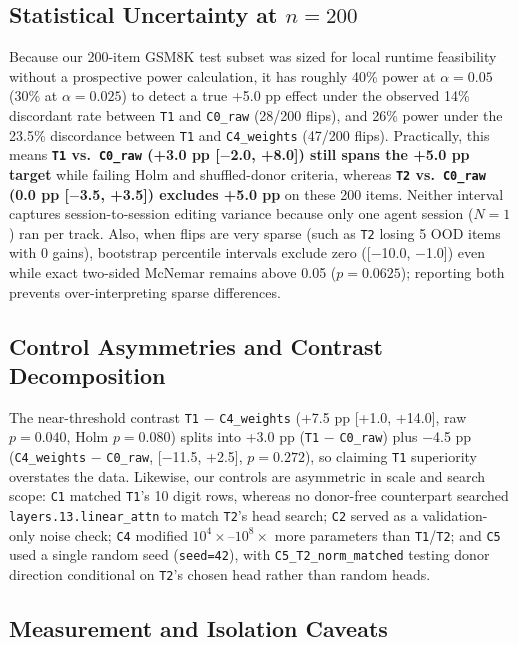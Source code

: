 \documentclass[11pt]{article}
\newcommand{\codepath}[1]{\texttt{\nolinkurl{#1}}}
\begin{document}
\subsection{Statistical Uncertainty at $n = 200$}

Because our 200-item GSM8K test subset was sized for local runtime feasibility without a prospective power calculation, it has roughly 40\% power at $\alpha=0.05$ (30\% at $\alpha=0.025$) to detect a true +5.0 pp effect under the observed 14\% discordant rate between \texttt{T1} and \texttt{C0\_raw} (28/200 flips), and 26\% power under the 23.5\% discordance between \texttt{T1} and \texttt{C4\_weights} (47/200 flips). Practically, this means \textbf{\texttt{T1} vs.\ \texttt{C0\_raw} (+3.0 pp [$-$2.0, +8.0]) still spans the +5.0 pp target} while failing Holm and shuffled-donor criteria, whereas \textbf{\texttt{T2} vs.\ \texttt{C0\_raw} (0.0 pp [$-$3.5, +3.5]) excludes +5.0 pp} on these 200 items. Neither interval captures session-to-session editing variance because only one agent session ($N=1$) ran per track. Also, when flips are very sparse (such as \texttt{T2} losing 5 OOD items with 0 gains), bootstrap percentile intervals exclude zero ([$-$10.0, $-$1.0]) even while exact two-sided McNemar remains above 0.05 ($p = 0.0625$); reporting both prevents over-interpreting sparse differences.

\subsection{Control Asymmetries and Contrast Decomposition}

The near-threshold contrast \texttt{T1} $-$ \texttt{C4\_weights} (+7.5 pp [+1.0, +14.0], raw $p = 0.040$, Holm $p = 0.080$) splits into +3.0 pp (\texttt{T1} $-$ \texttt{C0\_raw}) plus $-$4.5 pp (\texttt{C4\_weights} $-$ \texttt{C0\_raw}, [$-$11.5, +2.5], $p = 0.272$), so claiming \texttt{T1} superiority overstates the data. Likewise, our controls are asymmetric in scale and search scope: \texttt{C1} matched \texttt{T1}'s 10 digit rows, whereas no donor-free counterpart searched \codepath{layers.13.linear_attn} to match \texttt{T2}'s head search; \texttt{C2} served as a validation-only noise check; \texttt{C4} modified $10^{4}\times$--$10^{8}\times$ more parameters than \texttt{T1}/\texttt{T2}; and \texttt{C5} used a single random seed (\texttt{seed=42}), with \texttt{C5\_T2\_norm\_matched} testing donor direction conditional on \texttt{T2}'s chosen head rather than random heads.

\subsection{Measurement and Isolation Caveats}
\end{document}
